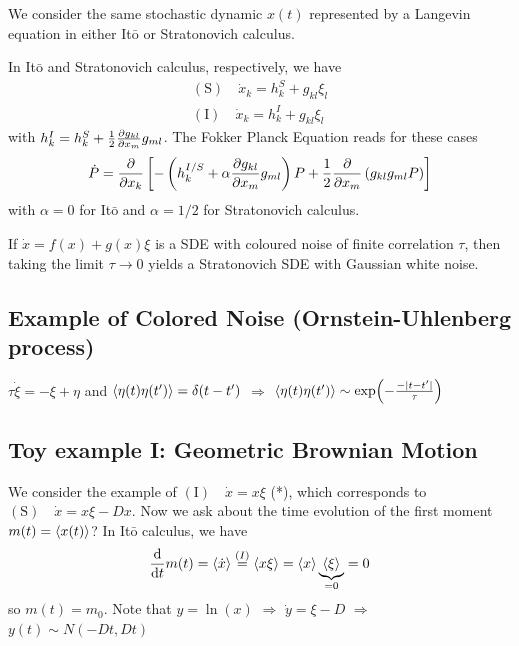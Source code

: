 \documentclass{notebook}
\begin{document}
We consider the same stochastic dynamic $x(t)$ represented by a Langevin equation in either It$\bar{\mathrm{o}}$ or Stratonovich calculus. 

In It$\bar{\mathrm{o}}$ and Stratonovich calculus, respectively, we have
%
\begin{gather*}
\mathrm{(S)} \quad \dot{x}_k = h^S_k + g_{kl} \xi_l \\
\mathrm{(I)} \quad \dot{x}_k = h^I_k + g_{kl} \xi_l
\end{gather*}
%
with $h^I_k = h^S_k + \frac{1}{2} \pdv{g_{kl}}{x_m} g_{ml}$. The Fokker Planck Equation reads for these cases
%
\begin{equation}
\dot{P} = \pdv{x_k} \left[ -\left( h^{I/S}_k + \alpha \pdv{g_{kl}}{x_m} g_{ml} \right) P + \frac{1}{2} \pdv{x_m} \left( g_{kl} g_{ml} P \right) \right]
\end{equation}
%
with $\alpha = 0$ for It$\bar{\mathrm{o}}$ and $\alpha = 1/2$ for Stratonovich calculus.

\begin{theorem}
	If $\dot{x} = f(x) + g(x) \xi$ is a SDE with coloured noise of finite correlation $\tau$, then taking the limit $\tau \to 0$ yields a Stratonovich SDE with Gaussian white noise.
\end{theorem}


\subsection*{Example of Colored Noise (Ornstein-Uhlenberg process)}

$\tau \dot{\xi} = - \xi + \eta$ and $\expval{\eta(t) \eta(t')} = \delta(t-t')$ $\Rightarrow$ $\expval{\eta(t) \eta(t')} \sim \exp(- \frac{-|t-t'|}{\tau})$

\subsection*{Toy example I: Geometric Brownian Motion}

We consider the example of $\mathrm{(I)} \quad \dot{x} = x \xi$ (*), which corresponds to $\mathrm{(S)} \quad \dot{x} = x \xi - Dx$. Now we ask about the time evolution of the first moment $m(t) = \expval{x(t)}$? In It$\bar{\mathrm{o}}$ calculus, we have
%
\begin{equation}
	\dv{t} m(t) = \expval{\dot{x}} \overset{(I)}{=} \expval{x \xi} = \expval{x} \underbrace{\expval{\xi}}_{= 0} = 0
\end{equation}
%
so $m(t) = m_0$. Note that $y = \ln(x)$ $\Rightarrow$ $\dot{y} = \xi - D$ $\Rightarrow$ $y(t) \sim N(-D t, D t)$
\end{document}
